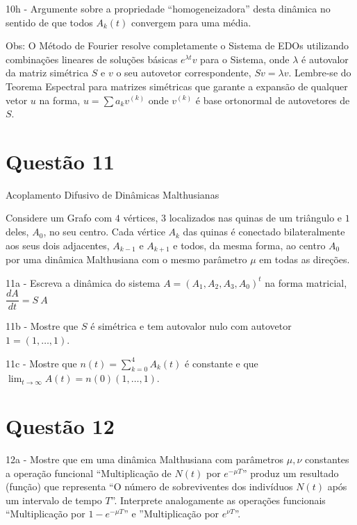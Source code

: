     10h - Argumente sobre a propriedade ``homogeneizadora'' desta dinâmica no sentido de que todos \(A_k(t)\) convergem para uma média.

    {\small Obs: O Método de Fourier resolve completamente o Sistema de EDOs utilizando combinações lineares de soluções básicas \(e^{\lambda t} v\) para o Sistema, onde \(\lambda\) é autovalor da matriz simétrica \(S\) e \(v\) o seu autovetor correspondente, \(Sv = \lambda v\). Lembre-se do Teorema Espectral para matrizes simétricas que garante a expansão de qualquer vetor \(u\) na forma, \(u = \displaystyle \sum a_k v^{(k)}\) onde \(v^{(k)}\) é base ortonormal de autovetores de \(S\).}



\section*{Questão 11}


Acoplamento Difusivo de Dinâmicas Malthusianas

    Considere um Grafo com \(4\) vértices, \(3\) localizados nas quinas de um triângulo e \(1\) deles, \(A_0\), no seu centro. Cada vértice \(A_k\) das quinas é conectado bilateralmente aos seus dois adjacentes, \(A_{k-1}\) e \(A_{k+1}\) e todos, da mesma forma, ao centro \(A_0\) por uma dinâmica Malthusiana com o mesmo parâmetro \(\mu\) em todas as direções.

    11a - Escreva a dinâmica do sistema \(A = (A_1, A_2, A_3, A_0)^t\) na forma matricial,
    \(\dfrac{dA}{dt} = S\ A\)

    11b - Mostre que \(S\) é simétrica e tem autovalor nulo com autovetor \(1 =(1, \ldots, 1)\).

    11c - Mostre que \(n(t) = \displaystyle \sum_{k=0}^{4} A_k(t)\) é constante e que \(\displaystyle \lim_{t \to \infty} A(t) = n(0) (1, \ldots, 1)\).



\section*{Questão 12}



    12a - Mostre que em uma dinâmica Malthusiana com parâmetros \(\mu, \nu\) constantes a operação funcional ``Multiplicação de \(N(t)\) por \(e^{-\mu T}\)'' produz um resultado (função) que representa ``O número de sobreviventes dos indivíduos \(N(t)\) após um intervalo de tempo \(T\)''. Interprete analogamente as operações funcionais ``Multiplicação por \(1-e^{-\mu T}\)'' e ''Multiplicação por \(e^{\nu T}\)''.

